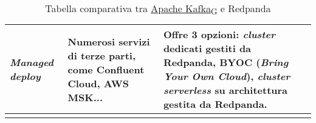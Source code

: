 \begin{longtable}{|p{4cm}||p{5.5cm}|p{5.5cm}|}
	\hline
	\textbf{\textit{Managed deploy}}     & Numerosi servizi di terze parti, come Confluent Cloud, AWS MSK...             & Offre 3 opzioni: \textit{cluster} dedicati gestiti da Redpanda, BYOC (\textit{Bring Your Own Cloud}), \textit{cluster serverless} su architettura gestita da Redpanda.           \\
	\hline
	\caption{Tabella comparativa tra \href{https://7last.github.io/docs/rtb/documentazione-interna/glossario#apache-kafka}{Apache Kafka\textsubscript{G}} e Redpanda}
	\label{table:1}
\end{longtable}


